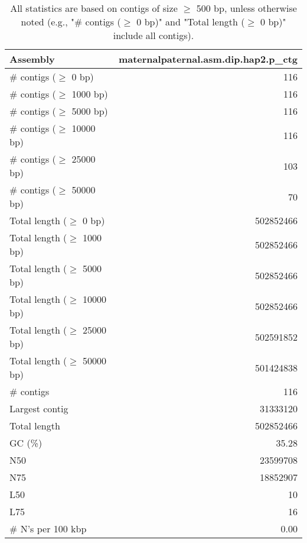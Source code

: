 \documentclass[12pt,a4paper]{article}
\begin{document}
\begin{table}[ht]
\begin{center}
\caption{All statistics are based on contigs of size $\geq$ 500 bp, unless otherwise noted (e.g., "\# contigs ($\geq$ 0 bp)" and "Total length ($\geq$ 0 bp)" include all contigs).}
\begin{tabular}{|l*{1}{|r}|}
\hline
Assembly & maternalpaternal.asm.dip.hap2.p\_ctg \\ \hline
\# contigs ($\geq$ 0 bp) & 116 \\ \hline
\# contigs ($\geq$ 1000 bp) & 116 \\ \hline
\# contigs ($\geq$ 5000 bp) & 116 \\ \hline
\# contigs ($\geq$ 10000 bp) & 116 \\ \hline
\# contigs ($\geq$ 25000 bp) & 103 \\ \hline
\# contigs ($\geq$ 50000 bp) & 70 \\ \hline
Total length ($\geq$ 0 bp) & 502852466 \\ \hline
Total length ($\geq$ 1000 bp) & 502852466 \\ \hline
Total length ($\geq$ 5000 bp) & 502852466 \\ \hline
Total length ($\geq$ 10000 bp) & 502852466 \\ \hline
Total length ($\geq$ 25000 bp) & 502591852 \\ \hline
Total length ($\geq$ 50000 bp) & 501424838 \\ \hline
\# contigs & 116 \\ \hline
Largest contig & 31333120 \\ \hline
Total length & 502852466 \\ \hline
GC (\%) & 35.28 \\ \hline
N50 & 23599708 \\ \hline
N75 & 18852907 \\ \hline
L50 & 10 \\ \hline
L75 & 16 \\ \hline
\# N's per 100 kbp & 0.00 \\ \hline
\end{tabular}
\end{center}
\end{table}
\end{document}
